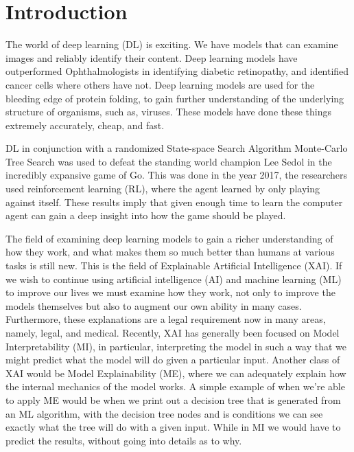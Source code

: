 \chapter{Introduction\label{cha:introduction}}

The world of deep learning (DL) is exciting. We have models that can examine
images and reliably identify their content. Deep learning models have
outperformed Ophthalmologists in identifying diabetic retinopathy, and identified
cancer cells where others have not. Deep learning models are used for the bleeding
edge of protein folding, to gain further understanding of the underlying structure of organisms, such as, viruses.\cite{deepmind:alphafold}
These models have done these things extremely accurately, cheap, and fast.

DL in conjunction with a randomized State-space Search Algorithm Monte-Carlo Tree Search was used to defeat the standing world champion Lee Sedol\cite{silver:alphagozero} in the incredibly expansive game of Go. This was done in the year 2017, the researchers used reinforcement learning (RL), where the agent learned by only playing against itself.
These results imply that given enough time to learn the computer agent can gain a deep insight into how the game should be played.

The field of examining deep learning models to gain a richer understanding
of how they work, and what makes them so much better than humans at various tasks
is still new. This is the field of Explainable Artificial Intelligence (XAI).
If we wish to continue using artificial intelligence (AI) and machine learning (ML)
to improve our lives we must examine how they work, not only to improve
the models themselves but also to augment our own ability in many cases.
Furthermore, these explanations are a legal requirement now in many areas\cite{legalexplanation:goodman}, namely, legal, and
medical. Recently, XAI has generally been focused on Model Interpretability (MI), in
particular, interpreting the model in such a way that we might predict what the model will
do given a particular input. Another class of XAI would be Model Explainability (ME), where we can adequately explain how the internal mechanics of the model works.
A simple example of when we're able to apply ME would be when we print out a decision tree
that is generated from an ML algorithm, with the decision tree nodes and is conditions we can see exactly what the tree will do with a given input. While in MI we would have to predict the results, without going into details as to why.


